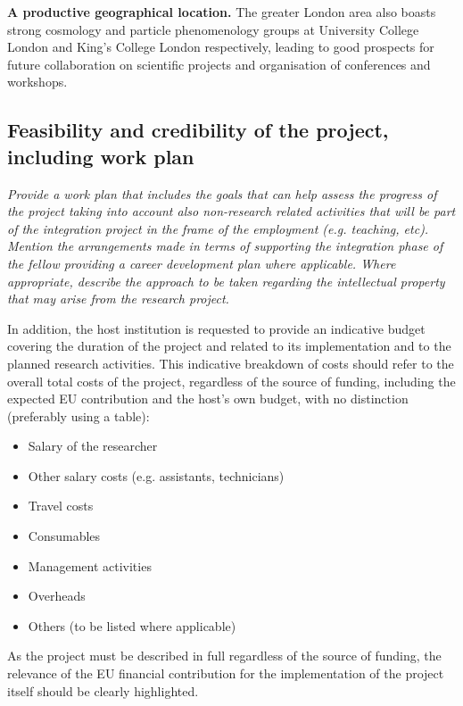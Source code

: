 \documentclass[a4paper,11pt]{article}
\newenvironment{xcomment}{\em}{}
\begin{document}
\textbf{A productive geographical location.}
The greater London area also boasts strong cosmology and particle phenomenology groups at University College London and King's College London respectively, leading to good prospects for future collaboration on scientific projects and organisation of conferences and workshops.

\subsection{Feasibility and credibility of the project, including work plan}

\begin{xcomment}
Provide a work plan that includes the goals that can help assess the
progress of the project taking into account also non-research related
activities that will be part of the integration project in the frame
of the employment (e.g. teaching, etc). Mention the arrangements made
in terms of supporting the integration phase of the fellow providing a
career development plan where applicable. Where appropriate, describe
the approach to be taken regarding the intellectual property that may
arise from the research project.

In addition, the host institution is requested to provide an
indicative budget covering the duration of the project and related to
its implementation and to the planned research activities. This
indicative breakdown of costs should refer to the overall total costs
of the project, regardless of the source of funding, including the
expected EU contribution and the host's own budget, with no
distinction (preferably using a table):

\begin{itemize}
\item Salary of the researcher
\item Other salary costs (e.g. assistants, technicians) 
\item Travel costs
\item Consumables
\item Management activities 
\item Overheads
\item Others (to be listed where applicable)  
\end{itemize}

As the project must be described in full regardless of the source of
funding, the relevance of the EU financial contribution for the
implementation of the project itself should be clearly highlighted.
\end{xcomment}
\end{document}
